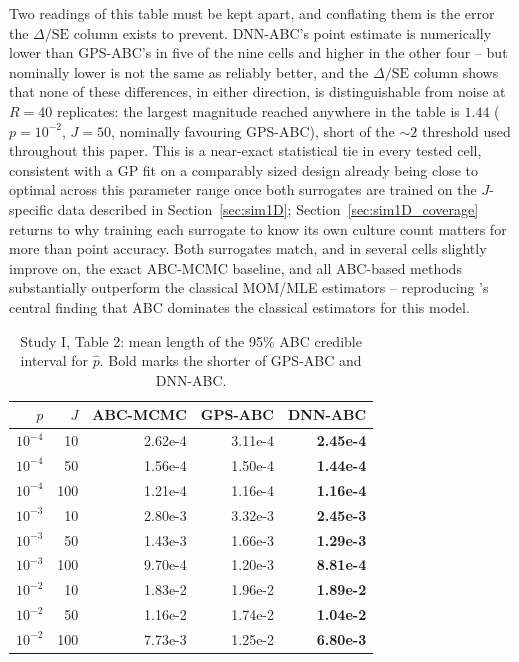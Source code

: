\documentclass[sn-basic,iicol,pdflatex]{sn-jnl}
\begin{document}
Two readings of this table must be kept apart, and conflating them is the error
the $\Delta/\mathrm{SE}$ column exists to prevent. DNN-ABC's point estimate is
numerically lower than GPS-ABC's in five of the nine cells and higher in the
other four -- but nominally lower is not the same as reliably better, and the
$\Delta/\mathrm{SE}$ column shows that none of these differences, in either
direction, is distinguishable from noise at $R=40$ replicates: the largest
magnitude reached anywhere in the table is $1.44$ ($p=10^{-2}$, $J=50$,
nominally favouring GPS-ABC), short of the $\sim 2$ threshold used throughout
this paper. This is a near-exact statistical tie in every tested cell, consistent with a
GP fit on a comparably sized design already being close to optimal across
this parameter range once both surrogates are trained on the $J$-specific
data described in Section~\ref{sec:sim1D}; Section~\ref{sec:sim1D_coverage}
returns to why training each surrogate to know its own culture count matters
for more than point accuracy. Both surrogates match, and in several
cells slightly improve on, the exact ABC-MCMC baseline, and all ABC-based
methods substantially outperform the classical MOM/MLE estimators --
reproducing \citeauthor{lu2023}'s central finding that ABC dominates the
classical estimators for this model.

\begin{table}[t]
\centering
\caption{Study I, Table 2: mean length of the 95\% ABC credible interval for
$\hat p$. Bold marks the shorter of GPS-ABC and DNN-ABC.}
\label{tab:ci1D}
\begin{tabular}{rrrrr}
\toprule
$p$ & $J$ & ABC-MCMC & GPS-ABC & DNN-ABC \\
\midrule
$10^{-4}$ & 10  & 2.62e-4 & 3.11e-4 & \textbf{2.45e-4} \\
$10^{-4}$ & 50  & 1.56e-4 & 1.50e-4 & \textbf{1.44e-4} \\
$10^{-4}$ & 100 & 1.21e-4 & 1.16e-4 & \textbf{1.16e-4} \\
$10^{-3}$ & 10  & 2.80e-3 & 3.32e-3 & \textbf{2.45e-3} \\
$10^{-3}$ & 50  & 1.43e-3 & 1.66e-3 & \textbf{1.29e-3} \\
$10^{-3}$ & 100 & 9.70e-4 & 1.20e-3 & \textbf{8.81e-4} \\
$10^{-2}$ & 10  & 1.83e-2 & 1.96e-2 & \textbf{1.89e-2} \\
$10^{-2}$ & 50  & 1.16e-2 & 1.74e-2 & \textbf{1.04e-2} \\
$10^{-2}$ & 100 & 7.73e-3 & 1.25e-2 & \textbf{6.80e-3} \\
\bottomrule
\end{tabular}
\end{table}
\end{document}
